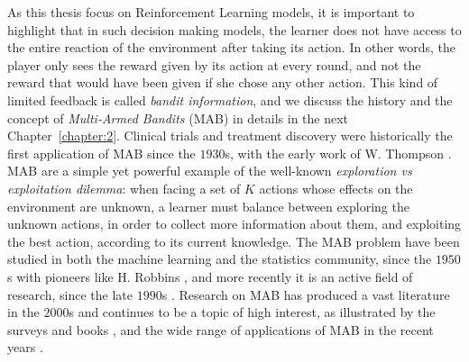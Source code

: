 As this thesis focus on Reinforcement Learning models,
it is important to highlight that in such decision making models, the learner does not have access to the entire reaction of the environment after taking its action.
%
In other words, the player only sees the reward given by its action at every round, and not the reward that would have been given if she chose any other action.
This kind of limited feedback is called \emph{bandit information}, and we discuss the history and the concept of \emph{Multi-Armed Bandits} (MAB) in details in the next Chapter~\ref{chapter:2}.
Clinical trials and treatment discovery were historically the first application of MAB since the $1930$s, with the early work of W. Thompson \cite{Thompson33}.
%
MAB are a simple yet powerful example of the well-known \emph{exploration vs exploitation dilemma}:
when facing a set of $K$ actions whose effects on the environment are unknown, a learner must balance between
exploring the unknown actions, in order to collect more information about them,
and exploiting the best action, according to its current knowledge.
%
The MAB problem have been studied in both the machine learning and the statistics community, since the $1950$s with pioneers like H. Robbins \cite{Robbins52}, and more recently it is an active field of research, since the late $1990$s \cite{Anantharam87a,Anantharam87b,auer1995gambling,Agrawal95}.
Research on MAB has produced a vast literature in the $2000$s \cite{Auer02,Auer02NonStochastic,Audibert2009minimax} and continues to be a topic of high interest, as illustrated by the surveys and books \cite{Bubeck12,LattimoreBanditAlgorithmsBook,Slivkins2019}, and the wide range of applications of MAB in the recent years \cite{bouneffouf2019survey}.


